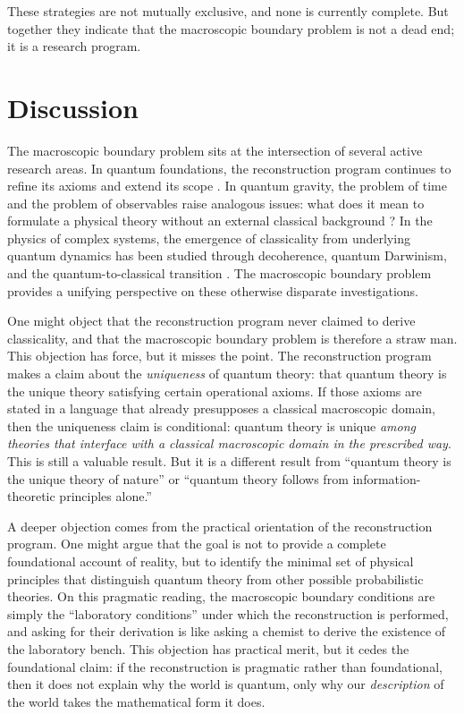 \documentclass[12pt,a4paper,twoside]{article}
\begin{document}
These strategies are not mutually exclusive, and none is currently complete. But together they indicate that the macroscopic boundary problem is not a dead end; it is a research program.

\section{Discussion}

The macroscopic boundary problem sits at the intersection of several active research areas. In quantum foundations, the reconstruction program continues to refine its axioms and extend its scope \cite{DAriano2017,Barnum2014}. In quantum gravity, the problem of time and the problem of observables raise analogous issues: what does it mean to formulate a physical theory without an external classical background \cite{Rovelli2004}? In the physics of complex systems, the emergence of classicality from underlying quantum dynamics has been studied through decoherence, quantum Darwinism, and the quantum-to-classical transition \cite{Zurek2009,Brandao2015}. The macroscopic boundary problem provides a unifying perspective on these otherwise disparate investigations.

One might object that the reconstruction program never claimed to derive classicality, and that the macroscopic boundary problem is therefore a straw man. This objection has force, but it misses the point. The reconstruction program makes a claim about the \emph{uniqueness} of quantum theory: that quantum theory is the unique theory satisfying certain operational axioms. If those axioms are stated in a language that already presupposes a classical macroscopic domain, then the uniqueness claim is conditional: quantum theory is unique \emph{among theories that interface with a classical macroscopic domain in the prescribed way}. This is still a valuable result. But it is a different result from ``quantum theory is the unique theory of nature'' or ``quantum theory follows from information-theoretic principles alone.''

A deeper objection comes from the practical orientation of the reconstruction program. One might argue that the goal is not to provide a complete foundational account of reality, but to identify the minimal set of physical principles that distinguish quantum theory from other possible probabilistic theories. On this pragmatic reading, the macroscopic boundary conditions are simply the ``laboratory conditions'' under which the reconstruction is performed, and asking for their derivation is like asking a chemist to derive the existence of the laboratory bench. This objection has practical merit, but it cedes the foundational claim: if the reconstruction is pragmatic rather than foundational, then it does not explain why the world is quantum, only why our \emph{description} of the world takes the mathematical form it does.
\end{document}
